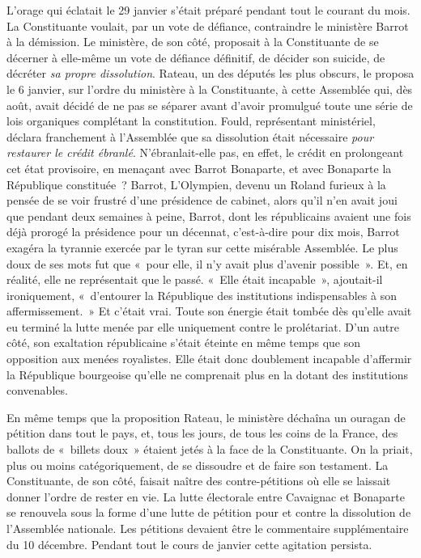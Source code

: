\documentclass[twoside]{book} %
\begin{document}
L’orage qui éclatait le 29 janvier s’était préparé pendant tout le courant du mois. La Constituante voulait, par un vote de défiance, contraindre le ministère Barrot à la démission. Le ministère, de son côté, proposait à la Constituante de se décerner à elle-même un vote de défiance définitif, de décider son suicide, de décréter \emph{sa propre dissolution}. Rateau, un des députés les plus obscurs, le proposa le 6 janvier, sur l’ordre du ministère à la Constituante, à cette Assemblée qui, dès août, avait décidé de ne pas se séparer avant d’avoir promulgué toute une série de lois organiques complétant la constitution. Fould, représentant ministériel, déclara franchement à l’Assemblée que sa dissolution était nécessaire \emph{pour restaurer le crédit ébranlé}. N’ébranlait-elle pas, en effet, le crédit en prolongeant cet état provisoire, en menaçant avec Barrot Bonaparte, et avec Bonaparte la République constituée ? Barrot, L’Olympien, devenu un Roland furieux à la pensée de se voir frustré d’une présidence de cabinet, alors qu’il n’en avait joui que pendant deux semaines à peine, Barrot, dont les républicains avaient une fois déjà prorogé la présidence pour un décennat, c’est-à-dire pour dix mois, Barrot exagéra la tyrannie exercée par le tyran sur cette misérable Assemblée. Le plus doux de ses mots fut que « pour elle, il n’y avait plus d’avenir possible ». Et, en réalité, elle ne représentait que le passé. « Elle était incapable », ajoutait-il ironiquement, « d’entourer la République des institutions indispensables à son affermissement. » Et c’était vrai. Toute son énergie était tombée dès qu’elle avait eu terminé la lutte menée par elle uniquement contre le prolétariat. D’un autre côté, son exaltation républicaine s’était éteinte en même temps que son opposition aux menées royalistes. Elle était donc doublement incapable d’affermir la République bourgeoise qu’elle ne comprenait plus en la dotant des institutions convenables.\par
En même temps que la proposition Rateau, le ministère déchaîna un ouragan de pétition dans tout le pays, et, tous les jours, de tous les coins de la France, des ballots de « billets doux » étaient jetés à la face de la Constituante. On la priait, plus ou moins catégoriquement, de se dissoudre et de faire son testament. La Constituante, de son côté, faisait naître des contre-pétitions où elle se laissait donner l’ordre de rester en vie. La lutte électorale entre Cavaignac et Bonaparte se renouvela sous la forme d’une lutte de pétition pour et contre la dissolution de l’Assemblée nationale. Les pétitions devaient être le commentaire supplémentaire du 10 décembre. Pendant tout le cours de janvier cette agitation persista.\par
\end{document}
